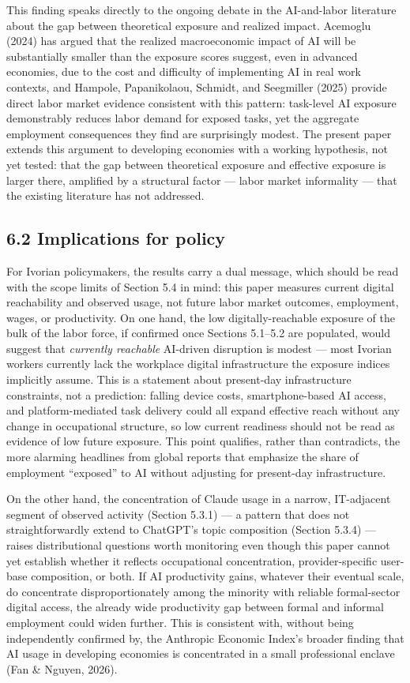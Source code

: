 \documentclass[
  11pt,
]{article}
\begin{document}
This finding speaks directly to the ongoing debate in the AI-and-labor
literature about the gap between theoretical exposure and realized
impact. Acemoglu (2024) has argued that the realized macroeconomic
impact of AI will be substantially smaller than the exposure scores
suggest, even in advanced economies, due to the cost and difficulty of
implementing AI in real work contexts, and Hampole, Papanikolaou,
Schmidt, and Seegmiller (2025) provide direct labor market evidence
consistent with this pattern: task-level AI exposure demonstrably
reduces labor demand for exposed tasks, yet the aggregate employment
consequences they find are surprisingly modest. The present paper
extends this argument to developing economies with a working hypothesis,
not yet tested: that the gap between theoretical exposure and effective
exposure is larger there, amplified by a structural factor --- labor
market informality --- that the existing literature has not addressed.

\subsection{6.2 Implications for policy}\label{implications-for-policy}

For Ivorian policymakers, the results carry a dual message, which should
be read with the scope limits of Section 5.4 in mind: this paper
measures current digital reachability and observed usage, not future
labor market outcomes, employment, wages, or productivity. On one hand,
the low digitally-reachable exposure of the bulk of the labor force, if
confirmed once Sections 5.1--5.2 are populated, would suggest that
\emph{currently reachable} AI-driven disruption is modest --- most
Ivorian workers currently lack the workplace digital infrastructure the
exposure indices implicitly assume. This is a statement about
present-day infrastructure constraints, not a prediction: falling device
costs, smartphone-based AI access, and platform-mediated task delivery
could all expand effective reach without any change in occupational
structure, so low current readiness should not be read as evidence of
low future exposure. This point qualifies, rather than contradicts, the
more alarming headlines from global reports that emphasize the share of
employment ``exposed'' to AI without adjusting for present-day
infrastructure.

On the other hand, the concentration of Claude usage in a narrow,
IT-adjacent segment of observed activity (Section 5.3.1) --- a pattern
that does not straightforwardly extend to ChatGPT's topic composition
(Section 5.3.4) --- raises distributional questions worth monitoring
even though this paper cannot yet establish whether it reflects
occupational concentration, provider-specific user-base composition, or
both. If AI productivity gains, whatever their eventual scale, do
concentrate disproportionately among the minority with reliable
formal-sector digital access, the already wide productivity gap between
formal and informal employment could widen further. This is consistent
with, without being independently confirmed by, the Anthropic Economic
Index's broader finding that AI usage in developing economies is
concentrated in a small professional enclave (Fan \& Nguyen, 2026).
\end{document}
